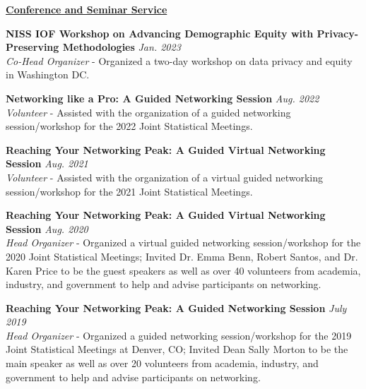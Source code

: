 \professionalspace
\underline{\textbf{\large Conference and Seminar Service}}\normalsize

\outreachspace
\textbf{NISS IOF Workshop on Advancing Demographic Equity with Privacy-Preserving Methodologies} \hfill \textit{Jan. 2023}\\
\textit{Co-Head Organizer} - Organized a two-day workshop on data privacy and equity in Washington DC.

\outreachspace
\textbf{Networking like a Pro: A Guided Networking Session} \hfill \textit{Aug. 2022}\\
\textit{Volunteer} - Assisted with the organization of a guided networking session/workshop for the 2022 Joint Statistical Meetings.

\outreachspace
\textbf{Reaching Your Networking Peak: A Guided Virtual Networking Session} \hfill \textit{Aug. 2021}\\
\textit{Volunteer} - Assisted with the organization of a virtual guided networking session/workshop for the 2021 Joint Statistical Meetings.

\outreachspace
\textbf{Reaching Your Networking Peak: A Guided Virtual Networking Session} \hfill \textit{Aug. 2020}\\
\textit{Head Organizer} - Organized a virtual guided networking session/workshop for the 2020 Joint Statistical Meetings; Invited Dr. Emma Benn, Robert Santos, and Dr. Karen Price to be the guest speakers as well as over 40 volunteers from academia, industry, and government to help and advise participants on networking.

\outreachspace
{}

\outreachspace
\textbf{Reaching Your Networking Peak: A Guided Networking Session} \hfill \textit{July 2019}\\
\textit{Head Organizer} - Organized a guided networking session/workshop for the 2019 Joint Statistical Meetings at Denver, CO; Invited Dean Sally Morton to be the main speaker as well as over 20 volunteers from academia, industry, and government to help and advise participants on networking.

